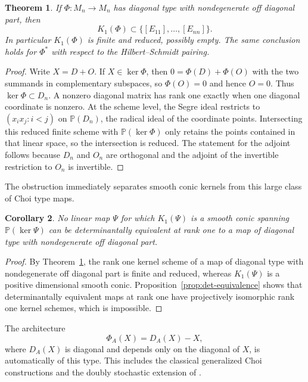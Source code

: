 \documentclass[11pt]{amsart}
\newcommand{\chg}[1]{#1}
\newcommand{\newrev}[1]{#1}
\theoremstyle{plain}
\newtheorem{theorem}{Theorem}[section]
\newtheorem{corollary}[theorem]{Corollary}
\theoremstyle{definition}
\theoremstyle{remark}
\begin{document}
\begin{theorem}\label{thm:diagonal-obstruction}
If $\Phi:M_n\to M_n$ has \chg{diagonal type} with nondegenerate \chg{off diagonal} part, then
\[
K_1(\Phi)\subset\{[E_{11}],\ldots,[E_{nn}]\}.
\]
In particular $K_1(\Phi)$ is finite {and reduced}, possibly empty. The same conclusion holds for $\Phi^*$ with respect to the Hilbert--Schmidt pairing.
\end{theorem}

\begin{proof}
Write $X=D+O$. If $X\in\ker\Phi$, then $0=\Phi(D)+\Phi(O)$ with the two summands in complementary subspaces, so $\Phi(O)=0$ and hence $O=0$. Thus $\ker\Phi\subset D_n$. A nonzero diagonal matrix has \chg{rank one} exactly when one diagonal coordinate is nonzero. {At the scheme level, the Segre ideal restricts to $(x_ix_j:i<j)$ on $\mathbb P(D_n)$, the radical ideal of the coordinate points. Intersecting this reduced finite scheme with $\mathbb P(\ker\Phi)$ only retains the points contained in that linear space, so the intersection is reduced.} The statement for the adjoint follows because $D_n$ and $O_n$ are orthogonal and the adjoint of the invertible restriction to $O_n$ is invertible.
\end{proof}

\chg{The obstruction immediately separates smooth conic kernels from this large class of Choi type maps.}

\begin{corollary}\label{cor:diagonal-separation}
\newrev{No linear map $\Psi$ for which $K_1(\Psi)$ is a smooth conic spanning $\mathbb P(\ker\Psi)$ can be} \chg{determinantally equivalent at rank one} to a map of \chg{diagonal type} with nondegenerate \chg{off diagonal} part.
\end{corollary}

\begin{proof}
\newrev{By Theorem~\ref{thm:diagonal-obstruction}, the rank one kernel scheme of a map of diagonal type with nondegenerate off diagonal part is finite and reduced, whereas $K_1(\Psi)$ is a positive dimensional smooth conic. Proposition~\ref{prop:det-equivalence} shows that determinantally equivalent maps at rank one have projectively isomorphic rank one kernel schemes, which is impossible.}
\end{proof}

The architecture
\[
\Phi_A(X)=D_A(X)-X,
\]
where $D_A(X)$ is diagonal and depends only on the diagonal of $X$, is automatically of this type. This includes the classical generalized Choi constructions \cite{ChoKyeLee1992,ChruscinskiMarciniakRutkowski2018} and the doubly stochastic extension of \cite{Bera2025}.
\end{document}
